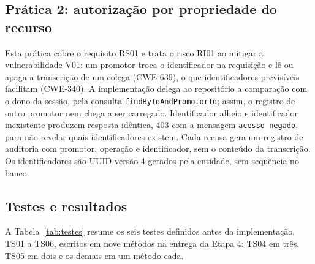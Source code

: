 \documentclass[12pt]{article}
\begin{document}
    \subsection{Prática 2: autorização por propriedade do recurso}

    Esta prática cobre o requisito RS01 e trata o risco RI01 ao mitigar a vulnerabilidade V01: um promotor troca o identificador na requisição e lê ou apaga a transcrição de um colega (CWE-639), o que identificadores previsíveis facilitam (CWE-340).
    A implementação delega ao repositório a comparação com o dono da sessão, pela consulta \texttt{findByIdAndPromotorId}; assim, o registro de outro promotor nem chega a ser carregado.
    Identificador alheio e identificador inexistente produzem resposta idêntica, 403 com a mensagem \texttt{acesso negado}, para não revelar quais identificadores existem.
    Cada recusa gera um registro de auditoria com promotor, operação e identificador, sem o conteúdo da transcrição.
    Os identificadores são UUID versão 4 gerados pela entidade, sem sequência no banco.

    \subsection{Testes e resultados}

    A Tabela~\ref{tab:testes} resume os seis testes definidos antes da implementação, TS01 a TS06, escritos em nove métodos na entrega da Etapa 4: TS04 em três, TS05 em dois e os demais em um método cada.
\end{document}
